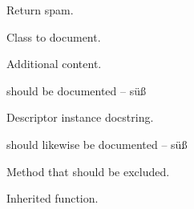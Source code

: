 \documentclass[letterpaper,10pt,english]{sphinxmanual}
\begin{document}

\begin{fulllineitems}
\label{autodoc:test_autodoc.function}
Return spam.

\end{fulllineitems}


\begin{fulllineitems}
Class to document.

Additional content.

\begin{fulllineitems}
should be documented -- süß

\end{fulllineitems}


\begin{fulllineitems}
Descriptor instance docstring.

\end{fulllineitems}


\begin{fulllineitems}
should likewise be documented -- süß

\end{fulllineitems}


\begin{fulllineitems}
Method that should be excluded.

\end{fulllineitems}


\begin{fulllineitems}
\label{autodoc:test_autodoc.Class.inheritedmeth}
Inherited function.

\end{fulllineitems}


\end{fulllineitems}
\end{document}
